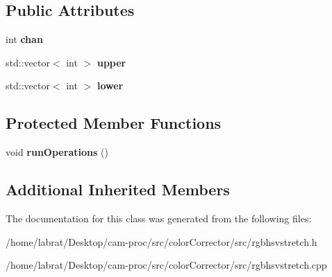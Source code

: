 \subsection*{Public Attributes}
\begin{DoxyCompactItemize}
\item 
int {\bfseries chan}\hypertarget{classRgbHsvStretch_a765c74e6a84796feb632a1a2749b1506}{}\label{classRgbHsvStretch_a765c74e6a84796feb632a1a2749b1506}

\item 
std\+::vector$<$ int $>$ {\bfseries upper}\hypertarget{classRgbHsvStretch_ac585ce98dd177832a22079bfea01b81a}{}\label{classRgbHsvStretch_ac585ce98dd177832a22079bfea01b81a}

\item 
std\+::vector$<$ int $>$ {\bfseries lower}\hypertarget{classRgbHsvStretch_a8eb138360e4231ad64706d9047efed3f}{}\label{classRgbHsvStretch_a8eb138360e4231ad64706d9047efed3f}

\end{DoxyCompactItemize}
\subsection*{Protected Member Functions}
\begin{DoxyCompactItemize}
\item 
void {\bfseries run\+Operations} ()\hypertarget{classRgbHsvStretch_a12194ac9b2a1006df88d468c7e9a1e68}{}\label{classRgbHsvStretch_a12194ac9b2a1006df88d468c7e9a1e68}

\end{DoxyCompactItemize}
\subsection*{Additional Inherited Members}


The documentation for this class was generated from the following files\+:\begin{DoxyCompactItemize}
\item 
/home/labrat/\+Desktop/cam-\/proc/src/color\+Corrector/src/rgbhsvstretch.\+h\item 
/home/labrat/\+Desktop/cam-\/proc/src/color\+Corrector/src/rgbhsvstretch.\+cpp\end{DoxyCompactItemize}
